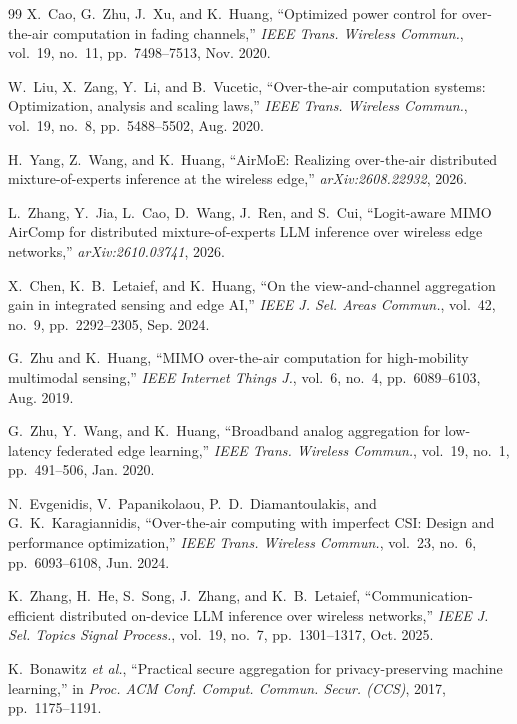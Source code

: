 \begin{thebibliography}{99}
 X.~Cao, G.~Zhu, J.~Xu, and K.~Huang, ``Optimized power control for over-the-air computation in fading channels,'' \emph{IEEE Trans. Wireless Commun.}, vol.~19, no.~11, pp.~7498--7513, Nov. 2020.

 W.~Liu, X.~Zang, Y.~Li, and B.~Vucetic, ``Over-the-air computation systems: Optimization, analysis and scaling laws,'' \emph{IEEE Trans. Wireless Commun.}, vol.~19, no.~8, pp.~5488--5502, Aug. 2020.

 H.~Yang, Z.~Wang, and K.~Huang, ``AirMoE: Realizing over-the-air distributed mixture-of-experts inference at the wireless edge,'' \emph{arXiv:2608.22932}, 2026.

 L.~Zhang, Y.~Jia, L.~Cao, D.~Wang, J.~Ren, and S.~Cui, ``Logit-aware MIMO AirComp for distributed mixture-of-experts LLM inference over wireless edge networks,'' \emph{arXiv:2610.03741}, 2026.

 X.~Chen, K.~B.~Letaief, and K.~Huang, ``On the view-and-channel aggregation gain in integrated sensing and edge AI,'' \emph{IEEE J. Sel. Areas Commun.}, vol.~42, no.~9, pp.~2292--2305, Sep. 2024.

 G.~Zhu and K.~Huang, ``MIMO over-the-air computation for high-mobility multimodal sensing,'' \emph{IEEE Internet Things J.}, vol.~6, no.~4, pp.~6089--6103, Aug. 2019.

 G.~Zhu, Y.~Wang, and K.~Huang, ``Broadband analog aggregation for low-latency federated edge learning,'' \emph{IEEE Trans. Wireless Commun.}, vol.~19, no.~1, pp.~491--506, Jan. 2020.

 N.~Evgenidis, V.~Papanikolaou, P.~D.~Diamantoulakis, and G.~K.~Karagiannidis, ``Over-the-air computing with imperfect CSI: Design and performance optimization,'' \emph{IEEE Trans. Wireless Commun.}, vol.~23, no.~6, pp.~6093--6108, Jun. 2024.

 K.~Zhang, H.~He, S.~Song, J.~Zhang, and K.~B.~Letaief, ``Communication-efficient distributed on-device LLM inference over wireless networks,'' \emph{IEEE J. Sel. Topics Signal Process.}, vol.~19, no.~7, pp.~1301--1317, Oct. 2025.

 K.~Bonawitz \emph{et al.}, ``Practical secure aggregation for privacy-preserving machine learning,'' in \emph{Proc. ACM Conf. Comput. Commun. Secur. (CCS)}, 2017, pp.~1175--1191.


\end{thebibliography}
